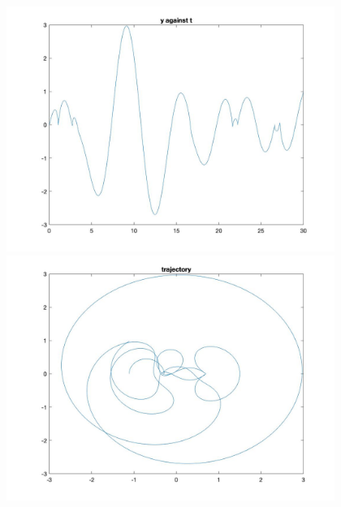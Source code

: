\documentclass[11pt]{article}
\begin{document}
\begin{figure}[H]
\includegraphics[width = 12cm, height = 8cm]{Q4(5)}
\includegraphics[width = 12cm, height = 8cm]{Q4(6)}
\end{figure}
\end{document}

